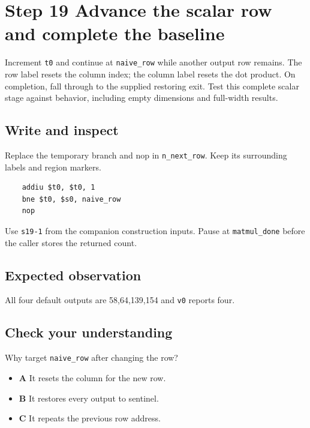 \section{Step 19 Advance the scalar row and complete the baseline}\label{matmul-s19}

Increment \texttt{t0} and continue at \texttt{naive\_row} while another output row remains. The row label resets the column index; the column label resets the dot product. On completion, fall through to the supplied restoring exit. Test this complete scalar stage against behavior, including empty dimensions and full-width results.

\subsection{Write and inspect}
Replace the temporary branch and nop in \texttt{n\_next\_row}. Keep its surrounding labels and region markers.

\begin{verbatim}
    addiu $t0, $t0, 1
    bne $t0, $s0, naive_row
    nop
\end{verbatim}
Use \texttt{s19-1} from the companion construction inputs. Pause at \texttt{matmul\_done} before the caller stores the returned count.

\subsection{Expected observation}
All four default outputs are 58,64,139,154 and \texttt{v0} reports four.

\subsection{Check your understanding}
Why target \texttt{naive\_row} after changing the row?

\begin{itemize}
  \item \textbf{A} It resets the column for the new row.
  \item \textbf{B} It restores every output to sentinel.
  \item \textbf{C} It repeats the previous row address.
\end{itemize}
